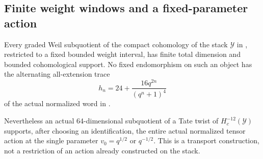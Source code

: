 \subsection{Finite weight windows and a fixed-parameter action}
\begin{finding}\label{f:finitewindow}
Every graded Weil subquotient of the compact cohomology of the
stack $\mathcal Y$ in , restricted to a fixed bounded
weight interval, has finite total dimension and bounded
cohomological support. No fixed endomorphism on such an object
has the alternating all-extension trace
\[
 h_n=24+\frac{16q^{2n}}{(q^n+1)^4}
\]
of the actual normalized word in .

Nevertheless an actual 64-dimensional subquotient of a Tate
twist of $H_c^{-12}(\mathcal Y)$ supports, after choosing an
identification, the entire actual normalized tensor action
at the single parameter $v_0=q^{1/2}$ or $q^{-1/2}$.
This is a transport construction, not a restriction of an action
already constructed on the stack.
\end{finding}

